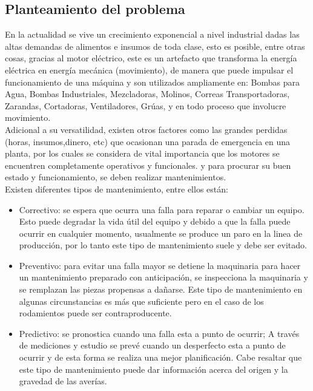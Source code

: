 \setcounter{page}{1}

\begin{center}
	\section{Planteamiento del problema}
\end{center}



	En la actualidad se vive un crecimiento exponencial a nivel industrial dadas las altas demandas de alimentos e insumos de toda clase, esto es posible, entre otras cosas, gracias al motor eléctrico, este es un artefacto que transforma la energía eléctrica en energía mecánica (movimiento), de manera que puede impulsar el funcionamiento de una máquina y son utilizados ampliamente en: Bombas para Agua, Bombas Industriales, Mezcladoras, Molinos, Correas Transportadoras, Zarandas, Cortadoras, Ventiladores, Grúas, y en todo proceso que involucre movimiento.\\
	Adicional a su versatilidad, existen otros factores como las grandes perdidas (horas, insumos,dinero, etc) que ocasionan una parada de emergencia en una planta, por los cuales se considera de vital importancia que los motores se encuentren completamente operativos y funcionales. y para procurar su buen estado y funcionamiento, se deben realizar mantenimientos.\\



	Existen diferentes tipos de mantenimiento, entre ellos están: 
	\begin{itemize}
		\item Correctivo: se espera que ocurra una falla para
	reparar o cambiar un equipo. Esto puede degradar la vida útil del equipo y debido a que la falla puede ocurrir en cualquier momento, usualmente se produce un paro en la linea de producción, por lo tanto este tipo de mantenimiento suele y debe ser evitado.

		\item Preventivo: para evitar una falla mayor se detiene la maquinaria para hacer un mantenimiento preparado con anticipación, se inspecciona la maquinaria y se remplazan las piezas propensas a dañarse. Este tipo de mantenimiento en algunas circunstancias es más que suficiente pero en el caso de los rodamientos puede ser contraproducente.

		\item Predictivo: se pronostica cuando una falla esta a punto de ocurrir; A través de mediciones y estudio se prevé cuando un desperfecto esta a punto de ocurrir y de esta forma se realiza una mejor planificación. Cabe resaltar que este tipo de mantenimiento puede dar información acerca del origen y la gravedad de las averías.
	\end{itemize}

